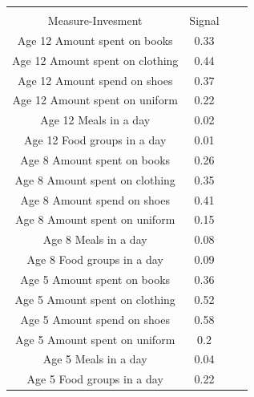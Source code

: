 \begin{table}  \begin{tabular}{@{\extracolsep{5pt}}cccc} \hline \tabularnewline 
Measure-Invesment & Signal \\ 
  \hline
Age 12 Amount spent on books & 0.33 \\ 
  Age 12 Amount spent on clothing & 0.44 \\ 
  Age 12 Amount spend on shoes & 0.37 \\ 
  Age 12 Amount spent on uniform & 0.22 \\ 
  Age 12 Meals in a day & 0.02 \\ 
  Age 12 Food groups in a day & 0.01 \\ 
  Age 8 Amount spent on books & 0.26 \\ 
  Age 8 Amount spent on clothing & 0.35 \\ 
  Age 8 Amount spend on shoes & 0.41 \\ 
  Age 8 Amount spent on uniform & 0.15 \\ 
  Age 8 Meals in a day & 0.08 \\ 
  Age 8 Food groups in a day & 0.09 \\ 
  Age 5 Amount spent on books & 0.36 \\ 
  Age 5 Amount spent on clothing & 0.52 \\ 
  Age 5 Amount spend on shoes & 0.58 \\ 
  Age 5 Amount spent on uniform & 0.2 \\ 
  Age 5 Meals in a day & 0.04 \\ 
  Age 5 Food groups in a day & 0.22 \\ 
   \hline

 \end{tabular} \end{table}
